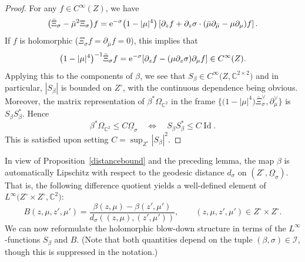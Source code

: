 \documentclass[pdftex]{sigma}
\numberwithin{equation}{section}
\theoremstyle{definition}
\newcommand{\C}{\mathbb{C}} %
\newcommand{\1}{{\bf 1}}
\newcommand{\Om}{{\underline{\Omega}}}
\begin{document}
\begin{proof} For any $f\in C^\infty(Z)$, we have
\begin{equation*}
\bigl(\bar \Xi_\sigma - \bar \mu^2 \Xi_\sigma\bigr)f = {\rm e}^{-\sigma} \bigl(1-|\mu|^4\bigr) \left[ \partial_z f + \partial_z \sigma\cdot (\bar \mu \partial_{\bar \mu} - \mu \partial_\mu)f\right].
\end{equation*}
If $f$ is holomorphic ($\Xi_\sigma f = \partial_{\bar \mu} f =0$), this implies that
\begin{equation*}%
\bigl(1-|\mu|^4\bigr)^{-1} \bar \Xi_\sigma f = {\rm e}^{-\sigma} [ \partial_z f - (\mu \partial_z \sigma) \partial_\mu f ] \in C^\infty(Z).
\end{equation*}
Applying this to the components of $\beta$, we see that $S_\beta \in C^\infty\bigl(Z,\C^{2\times 2}\bigr)$ and in particular, $|S_\beta|$ is bounded on $Z^\circ$, with the continuous dependence being obvious. Moreover, the matrix representation of $\beta^*\Omega_{\C^2}$ in the frame $\big\{\bigl(1-|\mu|^4\bigr)\bar \Xi_\sigma^\vee,\partial_\mu^\vee\big\}$ is $S_\beta S_\beta^*$. Hence
\begin{equation}\label{omegainequality1}
\beta^*\Omega_{\C^2} \le C \Om_\sigma\quad \Leftrightarrow \quad S_\beta S_\beta^* \le C \operatorname{Id}.
\end{equation}
This is satisfied upon setting $C=\sup_{Z^\circ}|S_\beta|^2$.
\end{proof}

In view of Proposition~\ref{distancebound} and the preceding lemma, the map $\beta$ is automatically Lipschitz with respect to the geodesic distance $d_\sigma$ on $(Z^\circ,\Om_\sigma)$. That is, the following difference quotient yields a well-defined element of $L^\infty\bigl(Z^\circ\times Z^\circ,\C^2\bigr)$:
\[
		B(z,\mu,z',\mu') = \frac{\beta(z,\mu)- \beta(z',\mu')}{d_\sigma((z,\mu),(z',\mu'))},\qquad (z,\mu,z',\mu')\in Z^\circ \times Z^\circ.
\]
We can now reformulate the holomorphic blow-down structure in terms of the $L^\infty$-functions $S_\beta$ and $B$. (Note that both quantities depend on the tuple $(\beta,\sigma)\in \mathcal I$, though this is suppressed in the notation.)
\end{document}
